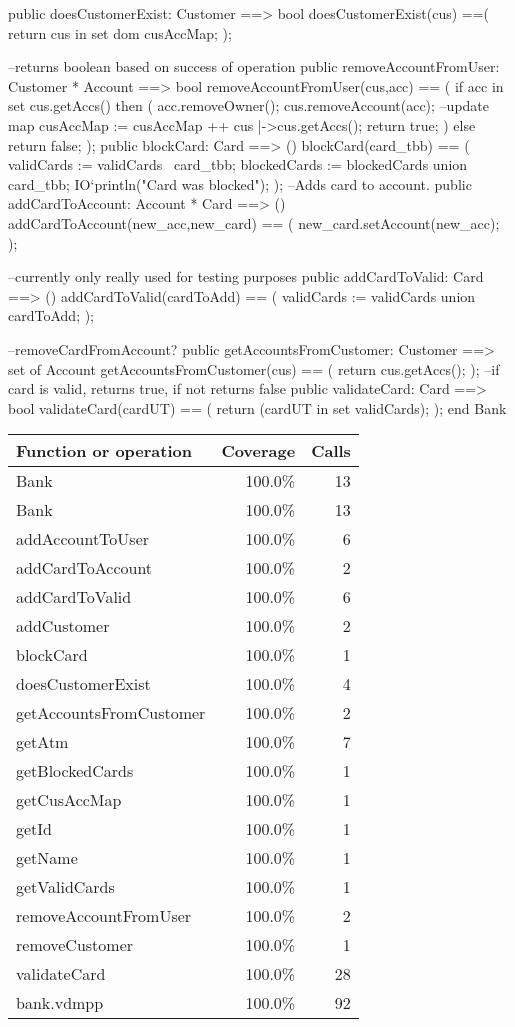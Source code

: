 \documentclass[a4paper]{article}
\begin{document}
\begin{vdm_al}
    public doesCustomerExist: Customer ==> bool
    doesCustomerExist(cus) ==(
        return cus in set dom cusAccMap;
    );

    --returns boolean based on success of operation
    public removeAccountFromUser: Customer * Account ==> bool
    removeAccountFromUser(cus,acc) == (
        if acc in set cus.getAccs() then (
            acc.removeOwner();
            cus.removeAccount(acc);
            --update map
            cusAccMap := cusAccMap ++ {cus |->cus.getAccs()};
            return true;
        ) 
        else return false;
    );
    public blockCard: Card ==> ()
    blockCard(card_tbb) == (
        validCards := validCards \ {card_tbb};
        blockedCards := blockedCards union {card_tbb};
        IO`println("Card was blocked");
    );
    --Adds card to account. 
    public addCardToAccount: Account * Card ==> ()
    addCardToAccount(new_acc,new_card) == (
        new_card.setAccount(new_acc);
    );

    --currently only really used for testing purposes
    public addCardToValid: Card ==> () 
    addCardToValid(cardToAdd) == (
        validCards := validCards union {cardToAdd};
    );

    --removeCardFromAccount?
    public getAccountsFromCustomer: Customer ==> set of Account
    getAccountsFromCustomer(cus) == (
        return cus.getAccs();
    );
    --if card is valid, returns true, if not returns false
    public validateCard: Card ==> bool
    validateCard(cardUT) == (
        return (cardUT in set validCards);  
    );
end Bank
\end{vdm_al}
\bigskip
\begin{longtable}{|l|r|r|}
\hline
Function or operation & Coverage & Calls \\
\hline
\hline
Bank & 100.0\% & 13 \\
\hline
Bank & 100.0\% & 13 \\
\hline
addAccountToUser & 100.0\% & 6 \\
\hline
addCardToAccount & 100.0\% & 2 \\
\hline
addCardToValid & 100.0\% & 6 \\
\hline
addCustomer & 100.0\% & 2 \\
\hline
blockCard & 100.0\% & 1 \\
\hline
doesCustomerExist & 100.0\% & 4 \\
\hline
getAccountsFromCustomer & 100.0\% & 2 \\
\hline
getAtm & 100.0\% & 7 \\
\hline
getBlockedCards & 100.0\% & 1 \\
\hline
getCusAccMap & 100.0\% & 1 \\
\hline
getId & 100.0\% & 1 \\
\hline
getName & 100.0\% & 1 \\
\hline
getValidCards & 100.0\% & 1 \\
\hline
removeAccountFromUser & 100.0\% & 2 \\
\hline
removeCustomer & 100.0\% & 1 \\
\hline
validateCard & 100.0\% & 28 \\
\hline
\hline
bank.vdmpp & 100.0\% & 92 \\
\hline
\end{longtable}
\end{document}
